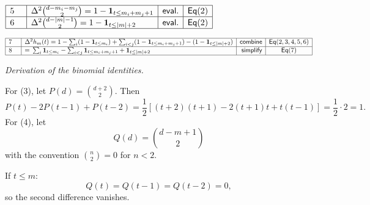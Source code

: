 \documentclass[11pt,reqno]{amsart}
\begin{document}
\nointerlineskip\noindent$%
\begin{array}{|m{0.5cm}|l|r|c|}
\hline
5 & \Delta^{2}\binom{d-m_{i}-m_{j}}{2}=1-\mathbf{1}_{t\le m_{i}+m_{j}+1} & 
\mathsf{eval.} & \mathsf{Eq}(2) \\ \hline
6 & \Delta^{2}\binom{d-|m|-1}{2}=1-\mathbf{1}_{t\le|m|+2} & \mathsf{eval.} & 
\mathsf{Eq}(2) \\ \hline
\end{array}%
$

\nointerlineskip\noindent $%
\begin{array}{|m{0.5cm}|l|r|c|}
\hline
7 & \Delta ^{2}h_{m}(t)=1-\sum_{i}(1-\mathbf{1}_{t\leq m_{i}})+\sum_{i<j}(1-%
\mathbf{1}_{t\leq m_{i}+m_{j}+1})-(1-\mathbf{1}_{t\leq |m|+2}) & \mathsf{%
combine} & \mathsf{Eq}(2,3,4,5,6) \\ \hline
8 & =\,\sum_{i}\mathbf{1}_{t\leq m_{i}}-\sum_{i<j}\mathbf{1}_{t\leq
m_{i}+m_{j}+1}+\mathbf{1}_{t\leq |m|+2} & \mathsf{simplify} & \mathsf{Eq}(7)
\\ \hline
\end{array}%
$

\bigskip 

\medskip%

\medskip \noindent \textit{Derivation of the binomial identities.} 

\bigskip 
\medskip%

\noindent%
For (3), let $P(d)=\binom{d+2}{2}$. Then 
\begin{equation*}
P(t)-2P(t-1)+P(t-2)=\frac{1}{2}[(t+2)(t+1)-2(t+1)t+t(t-1)]=\frac{1}{2}\cdot
2=1.
\end{equation*}%
\noindent%
For (4), let 
\begin{equation*}
Q(d)=\binom{d-m+1}{2}
\end{equation*}
\noindent%
with the convention $\binom{n}{2}=0$ for $n<2$.

\bigskip 
\medskip%

If $t\leq m$: 
\begin{equation*}
Q(t)=Q(t-1)=Q(t-2)=0,
\end{equation*}%
so the second difference vanishes. 
\end{document}
